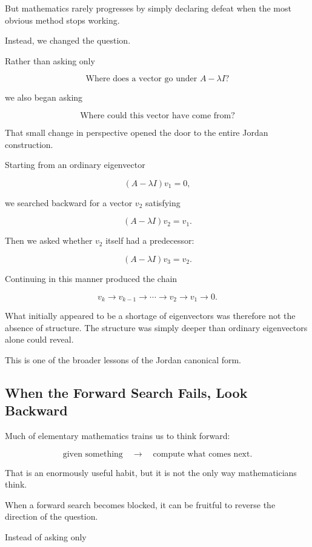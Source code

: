 \documentclass[11pt]{article}
\begin{document}
But mathematics rarely progresses by simply declaring defeat when the
most obvious method stops working.

Instead, we changed the question.

Rather than asking only

\[
\boxed{
\text{Where does a vector go under }A-\lambda I?
}
\]

we also began asking

\[
\boxed{
\text{Where could this vector have come from?}
}
\]

That small change in perspective opened the door to the entire Jordan
construction.

Starting from an ordinary eigenvector

\[
(A-\lambda I)v_1=0,
\]

we searched backward for a vector \(v_2\) satisfying

\[
(A-\lambda I)v_2=v_1.
\]

Then we asked whether \(v_2\) itself had a predecessor:

\[
(A-\lambda I)v_3=v_2.
\]

Continuing in this manner produced the chain

\[
\boxed{
v_k
\longrightarrow
v_{k-1}
\longrightarrow
\cdots
\longrightarrow
v_2
\longrightarrow
v_1
\longrightarrow
0.
}
\]

What initially appeared to be a shortage of eigenvectors was therefore
not the absence of structure.  The structure was simply deeper than
ordinary eigenvectors alone could reveal.

This is one of the broader lessons of the Jordan canonical form.


\subsection*{When the Forward Search Fails, Look Backward}

Much of elementary mathematics trains us to think forward:

\[
\text{given something}
\quad\longrightarrow\quad
\text{compute what comes next}.
\]

That is an enormously useful habit, but it is not the only way
mathematicians think.

When a forward search becomes blocked, it can be fruitful to reverse
the direction of the question.

Instead of asking only
\end{document}
